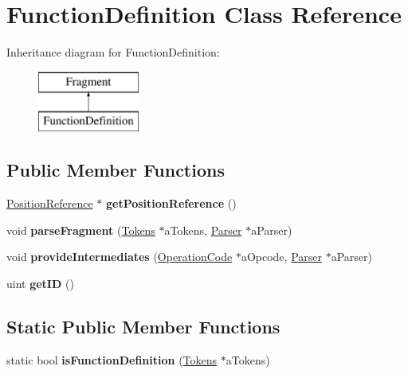 \hypertarget{a00010}{\section{Function\+Definition Class Reference}
\label{a00010}
}
Inheritance diagram for Function\+Definition\+:\begin{figure}[H]
\begin{center}
\leavevmode
\includegraphics[height=2.000000cm]{d7/dec/a00010}
\end{center}
\end{figure}
\subsection*{Public Member Functions}
\begin{DoxyCompactItemize}
\item 
\hypertarget{a00010_a58c9debf23ec862b0d920d7f3231e2a2}{\hyperlink{a00019}{Position\+Reference} $\ast$ {\bfseries get\+Position\+Reference} ()}\label{a00010_a58c9debf23ec862b0d920d7f3231e2a2}

\item 
\hypertarget{a00010_af6129d50e3f39cb8b318f68a235df94a}{void {\bfseries parse\+Fragment} (\hyperlink{a00026}{Tokens} $\ast$a\+Tokens, \hyperlink{a00017}{Parser} $\ast$a\+Parser)}\label{a00010_af6129d50e3f39cb8b318f68a235df94a}

\item 
\hypertarget{a00010_ad71d600ad87b03c4d6d1d4c906e91795}{void {\bfseries provide\+Intermediates} (\hyperlink{a00015}{Operation\+Code} $\ast$a\+Opcode, \hyperlink{a00017}{Parser} $\ast$a\+Parser)}\label{a00010_ad71d600ad87b03c4d6d1d4c906e91795}

\item 
\hypertarget{a00010_a111684d7a2147f1541e88d9ec2692a39}{uint {\bfseries get\+I\+D} ()}\label{a00010_a111684d7a2147f1541e88d9ec2692a39}

\end{DoxyCompactItemize}
\subsection*{Static Public Member Functions}
\begin{DoxyCompactItemize}
\item 
\hypertarget{a00010_aa5559af30e7e7e4aa3be29be6b3bda7e}{static bool {\bfseries is\+Function\+Definition} (\hyperlink{a00026}{Tokens} $\ast$a\+Tokens)}\label{a00010_aa5559af30e7e7e4aa3be29be6b3bda7e}

\end{DoxyCompactItemize}
